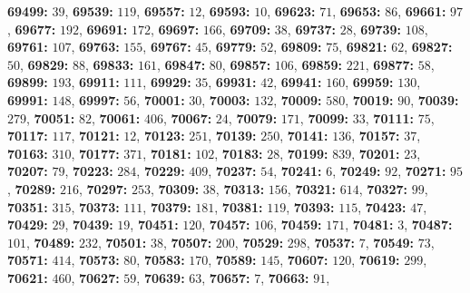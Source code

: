 \textsf{\bfseries 69499:} $39$, \textsf{\bfseries 69539:} $119$, \textsf{\bfseries 69557:} $12$, \textsf{\bfseries 69593:} $10$, \textsf{\bfseries 69623:} $71$, \textsf{\bfseries 69653:} $86$, \textsf{\bfseries 69661:} $97$, \textsf{\bfseries 69677:} $192$, \textsf{\bfseries 69691:} $172$, \textsf{\bfseries 69697:} $166$, \textsf{\bfseries 69709:} $38$, \textsf{\bfseries 69737:} $28$, \textsf{\bfseries 69739:} $108$, \textsf{\bfseries 69761:} $107$, \textsf{\bfseries 69763:} $155$, \textsf{\bfseries 69767:} $45$, \textsf{\bfseries 69779:} $52$, \textsf{\bfseries 69809:} $75$, \textsf{\bfseries 69821:} $62$, \textsf{\bfseries 69827:} $50$, \textsf{\bfseries 69829:} $88$, \textsf{\bfseries 69833:} $161$, \textsf{\bfseries 69847:} $80$, \textsf{\bfseries 69857:} $106$, \textsf{\bfseries 69859:} $221$, \textsf{\bfseries 69877:} $58$, \textsf{\bfseries 69899:} $193$, \textsf{\bfseries 69911:} $111$, \textsf{\bfseries 69929:} $35$, \textsf{\bfseries 69931:} $42$, \textsf{\bfseries 69941:} $160$, \textsf{\bfseries 69959:} $130$, \textsf{\bfseries 69991:} $148$, \textsf{\bfseries 69997:} $56$, \textsf{\bfseries 70001:} $30$, \textsf{\bfseries 70003:} $132$, \textsf{\bfseries 70009:} $580$, \textsf{\bfseries 70019:} $90$, \textsf{\bfseries 70039:} $279$, \textsf{\bfseries 70051:} $82$, \textsf{\bfseries 70061:} $406$, \textsf{\bfseries 70067:} $24$, \textsf{\bfseries 70079:} $171$, \textsf{\bfseries 70099:} $33$, \textsf{\bfseries 70111:} $75$, \textsf{\bfseries 70117:} $117$, \textsf{\bfseries 70121:} $12$, \textsf{\bfseries 70123:} $251$, \textsf{\bfseries 70139:} $250$, \textsf{\bfseries 70141:} $136$, \textsf{\bfseries 70157:} $37$, \textsf{\bfseries 70163:} $310$, \textsf{\bfseries 70177:} $371$, \textsf{\bfseries 70181:} $102$, \textsf{\bfseries 70183:} $28$, \textsf{\bfseries 70199:} $839$, \textsf{\bfseries 70201:} $23$, \textsf{\bfseries 70207:} $79$, \textsf{\bfseries 70223:} $284$, \textsf{\bfseries 70229:} $409$, \textsf{\bfseries 70237:} $54$, \textsf{\bfseries 70241:} $6$, \textsf{\bfseries 70249:} $92$, \textsf{\bfseries 70271:} $95$, \textsf{\bfseries 70289:} $216$, \textsf{\bfseries 70297:} $253$, \textsf{\bfseries 70309:} $38$, \textsf{\bfseries 70313:} $156$, \textsf{\bfseries 70321:} $614$, \textsf{\bfseries 70327:} $99$, \textsf{\bfseries 70351:} $315$, \textsf{\bfseries 70373:} $111$, \textsf{\bfseries 70379:} $181$, \textsf{\bfseries 70381:} $119$, \textsf{\bfseries 70393:} $115$, \textsf{\bfseries 70423:} $47$, \textsf{\bfseries 70429:} $29$, \textsf{\bfseries 70439:} $19$, \textsf{\bfseries 70451:} $120$, \textsf{\bfseries 70457:} $106$, \textsf{\bfseries 70459:} $171$, \textsf{\bfseries 70481:} $3$, \textsf{\bfseries 70487:} $101$, \textsf{\bfseries 70489:} $232$, \textsf{\bfseries 70501:} $38$, \textsf{\bfseries 70507:} $200$, \textsf{\bfseries 70529:} $298$, \textsf{\bfseries 70537:} $7$, \textsf{\bfseries 70549:} $73$, \textsf{\bfseries 70571:} $414$, \textsf{\bfseries 70573:} $80$, \textsf{\bfseries 70583:} $170$, \textsf{\bfseries 70589:} $145$, \textsf{\bfseries 70607:} $120$, \textsf{\bfseries 70619:} $299$, \textsf{\bfseries 70621:} $460$, \textsf{\bfseries 70627:} $59$, \textsf{\bfseries 70639:} $63$, \textsf{\bfseries 70657:} $7$, \textsf{\bfseries 70663:} $91$, 
